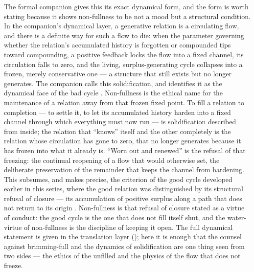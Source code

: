 The formal companion gives this its exact dynamical form, and the form is worth stating because it shows non-fullness to be not a mood but a structural condition. In the companion's dynamical layer, a generative relation is a circulating flow, and there is a definite way for such a flow to die: when the parameter governing whether the relation's accumulated history is forgotten or compounded tips toward compounding, a positive feedback locks the flow into a fixed channel, its circulation falls to zero, and the living, surplus-generating cycle collapses into a frozen, merely conservative one --- a structure that still exists but no longer generates. The companion calls this solidification, and identifies it as the dynamical face of the bad cycle \parencite{wan2026braid}. Non-fullness is the ethical name for the maintenance of a relation away from that frozen fixed point. To fill a relation to completion --- to settle it, to let its accumulated history harden into a fixed channel through which everything must now run --- is solidification described from inside; the relation that ``knows'' itself and the other completely is the relation whose circulation has gone to zero, that no longer generates because it has frozen into what it already is. ``Worn out and renewed'' is the refusal of that freezing: the continual reopening of a flow that would otherwise set, the deliberate preservation of the remainder that keeps the channel from hardening. This subsumes, and makes precise, the criterion of the good cycle developed earlier in this series, where the good relation was distinguished by its structural refusal of closure --- its accumulation of positive surplus along a path that does not return to its origin \parencite{paperix}. Non-fullness is that refusal of closure stated as a virtue of conduct: the good cycle is the one that does not fill itself shut, and the water-virtue of non-fullness is the discipline of keeping it open. The full dynamical statement is given in the translation layer (); here it is enough that the counsel against brimming-full and the dynamics of solidification are one thing seen from two sides --- the ethics of the unfilled and the physics of the flow that does not freeze.
